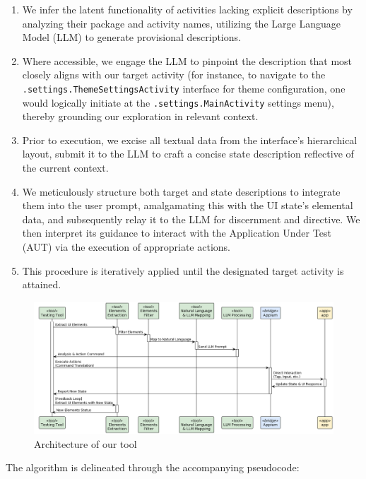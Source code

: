\documentclass[conference]{IEEEtran}
\begin{document}
\begin{enumerate}
	\item We infer the latent functionality of activities lacking explicit descriptions by analyzing their package and activity names, utilizing the Large Language Model (LLM) to generate provisional descriptions.
	\item Where accessible, we engage the LLM to pinpoint the description that most closely aligns with our target activity (for instance, to navigate to the \texttt{.settings.ThemeSettingsActivity} interface for theme configuration, one would logically initiate at the \texttt{.settings.MainActivity} settings menu), thereby grounding our exploration in relevant context.
	\item Prior to execution, we excise all textual data from the interface's hierarchical layout, submit it to the LLM to craft a concise state description reflective of the current context.
	\item We meticulously structure both target and state descriptions to integrate them into the user prompt, amalgamating this with the UI state's elemental data, and subsequently relay it to the LLM for discernment and directive. We then interpret its guidance to interact with the Application Under Test (AUT) via the execution of appropriate actions.
	\item This procedure is iteratively applied until the designated target activity is attained.
\end{enumerate}
\begin{figure}
    \centering
    \includegraphics[width=1\linewidth]{assets/PlantUML-time-seq-graph.png}
    \caption{Architecture of our tool}
    \label{fig:enter-label}
\end{figure}
The algorithm is delineated through the accompanying pseudocode:
\end{document}
